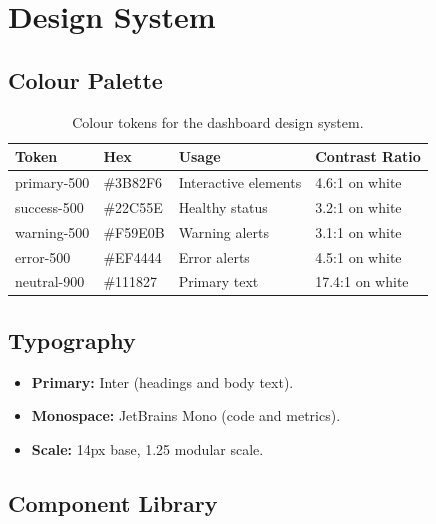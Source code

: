 \documentclass[
    language=english,
    doctype=technical-report,
    institution=none,
    titlestyle=book,
    oneside,
]{../../omnilatex}
\begin{document}
\chapter{Design System}
\label{sec:design-system}

\section{Colour Palette}

\begin{table}[htbp]
    \centering
    \caption{Colour tokens for the dashboard design system.}
    \label{tab:colours}
    \begin{tabular}{@{}llll@{}}
        \toprule
        Token & Hex & Usage & Contrast Ratio \\
        \midrule
        primary-500 & \#3B82F6 & Interactive elements & 4.6:1 on white \\
        success-500 & \#22C55E & Healthy status & 3.2:1 on white \\
        warning-500 & \#F59E0B & Warning alerts & 3.1:1 on white \\
        error-500 & \#EF4444 & Error alerts & 4.5:1 on white \\
        neutral-900 & \#111827 & Primary text & 17.4:1 on white \\
        \bottomrule
    \end{tabular}
\end{table}

\section{Typography}

\begin{itemize}
    \item \textbf{Primary:} Inter (headings and body text).
    \item \textbf{Monospace:} JetBrains Mono (code and metrics).
    \item \textbf{Scale:} 14px base, 1.25 modular scale.
\end{itemize}

\section{Component Library}
\end{document}
